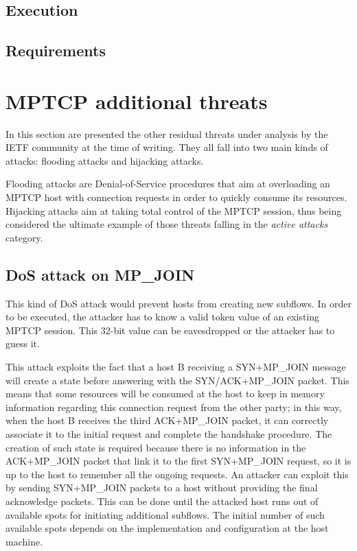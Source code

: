 \subsection{Execution}
\subsection{Requirements}

\section{MPTCP additional threats}
In this section are presented the other residual threats under analysis by the IETF community at the time of writing. They all fall into two main kinds of attacks: flooding attacks and hijacking attacks. 

Flooding attacks are Denial-of-Service procedures that aim at overloading an MPTCP host with connection requests in order to quickly consume its resources.
Hijacking attacks aim at taking total control of the MPTCP session, thus being considered the ultimate example of those threats falling in the \textit{active attacks} category.

\subsection{DoS attack on MP\_JOIN}
This kind of DoS attack would prevent hosts from creating new subflows. In order to be executed, the attacker has to know a valid token value of an existing MPTCP session. This 32-bit value can be eavesdropped or the attacker has to guess it.

This attack exploits the fact that a host B receiving a SYN+MP\_JOIN message will create a state before answering with the SYN/ACK+MP\_JOIN packet. This means that some resources will be consumed at the host to keep in memory information regarding this connection request from the other party; in this way, when the host B receives the third ACK+MP\_JOIN packet, it can correctly associate it to the initial request and complete the handshake procedure. The creation of such state is required because there is no information in the ACK+MP\_JOIN packet that link it to the first SYN+MP\_JOIN request, so it is up to the host to remember all the ongoing requests.
An attacker can exploit this by sending SYN+MP\_JOIN packets to a host without providing the final acknowledge packets. This can be done until the attacked host runs out of available spots for initiating additional subflows. The initial number of such available spots depends on the implementation and configuration at the host machine. 

